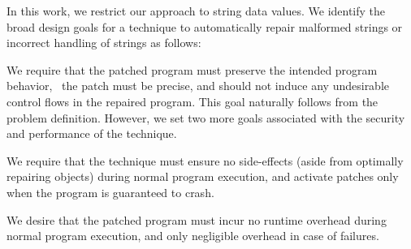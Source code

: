 


In this work, we restrict our approach to string data values. We identify the
broad design goals for a technique to automatically repair malformed strings or
incorrect handling of strings as follows:


 We require that the patched program must
preserve the intended program behavior, \ie\ the patch must be precise, and
should not induce any undesirable control flows in the repaired program. 
This goal naturally follows from the problem definition. However, we set two
more goals associated with the security and performance of the technique.

 We require that the technique
must ensure no side-effects (aside from optimally repairing objects) during
normal program execution, and activate patches only when the program is
guaranteed to crash.

 We desire that the patched program must
incur no runtime overhead during normal program execution, and only negligible
overhead in case of failures.

